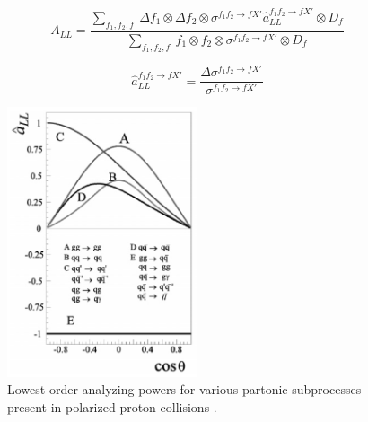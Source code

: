 \begin{equation}
  A_{LL} = \frac{\sum_{f_1,f_2,f}~\Delta f_1 \otimes \Delta f_2 \otimes \sigma^{f_1 f_2 \rightarrow f X'} \hat a_{LL}^{f_1 f_2 \rightarrow f X'} \otimes D_f}{\sum_{f_1,f_2,f}~f_1 \otimes f_2 \otimes \sigma^{f_1 f_2 \rightarrow f X'} \otimes D_f} 
\end{equation}

\begin{equation}
  \hat a_{LL}^{f_1 f_2 \rightarrow f X'} = \frac{\Delta \sigma^{f_1 f_2 \rightarrow f X'}}{\sigma^{f_1 f_2 \rightarrow f X'}}
\end{equation}

\begin{figure}\begin{center}
  \includegraphics[width=0.5\textwidth]{figures/partonic_asymmetry}
  \caption{Lowest-order analyzing powers for various partonic subprocesses
  present in polarized proton collisions \cite{Bunce:2000uv}.}
\end{center}\end{figure}
